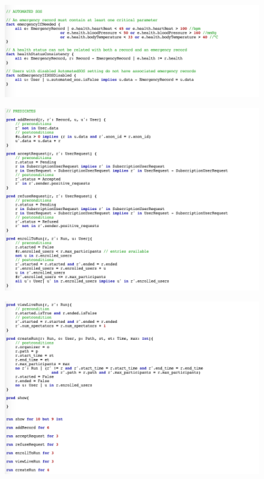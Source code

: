 \begin{figure}[H]
    \centering
    \includegraphics[scale=0.6]{rasdL/Pictures/alloy/model7.png}
\end{figure}
\begin{figure}[H]
    \centering
    \includegraphics[scale=0.6]{rasdL/Pictures/alloy/model8.png}
\end{figure}
\begin{figure}[H]
    \centering
    \includegraphics[scale=0.6]{rasdL/Pictures/alloy/model9.png}
\end{figure}

